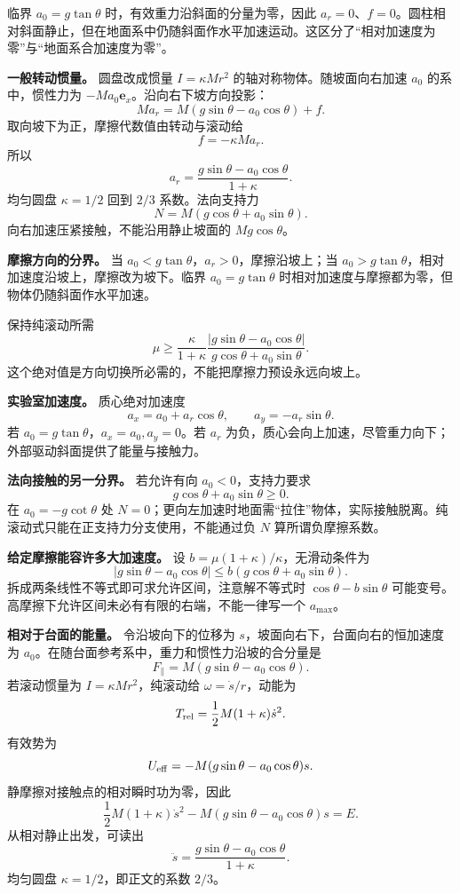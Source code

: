 \documentclass[12pt,a4paper,UTF8]{ctexart}
\begin{document}
临界 \(a_0=g\tan\theta\) 时，有效重力沿斜面的分量为零，因此
\(a_r=0\)、\(f=0\)。圆柱相对斜面静止，但在地面系中仍随斜面作水平加速运动。这区分了``相对加速度为零''与``地面系合加速度为零''。

\textbf{一般转动惯量。} 圆盘改成惯量 \(I=\kappa Mr^2\)
的轴对称物体。随坡面向右加速 \(a_0\) 的系中，惯性力为
\(-Ma_0\boldsymbol e_x\)。沿向右下坡方向投影： \[
Ma_r=M(g\sin\theta-a_0\cos\theta)+f.
\] 取向坡下为正，摩擦代数值由转动与滚动给 \[
f=-\kappa Ma_r.
\] 所以 \[
\boxed{a_r=\frac{g\sin\theta-a_0\cos\theta}{1+\kappa}}.
\] 均匀圆盘 \(\kappa=1/2\) 回到 \(2/3\) 系数。法向支持力 \[
N=M(g\cos\theta+a_0\sin\theta).
\] 向右加速压紧接触，不能沿用静止坡面的 \(Mg\cos\theta\)。

\textbf{摩擦方向的分界。} 当
\(a_0<g\tan\theta\)，\(a_r>0\)，摩擦沿坡上；当
\(a_0>g\tan\theta\)，相对加速度沿坡上，摩擦改为坡下。临界
\(a_0=g\tan\theta\) 时相对加速度与摩擦都为零，但物体仍随斜面作水平加速。

保持纯滚动所需 \[
\boxed{\mu\ge
\frac{\kappa}{1+\kappa}
\frac{|g\sin\theta-a_0\cos\theta|}
{g\cos\theta+a_0\sin\theta}}.
\] 这个绝对值是方向切换所必需的，不能把摩擦力预设永远向坡上。

\textbf{实验室加速度。} 质心绝对加速度 \[
a_x=a_0+a_r\cos\theta,\qquad
a_y=-a_r\sin\theta.
\] 若 \(a_0=g\tan\theta\)，\(a_x=a_0,a_y=0\)。若 \(a_r\)
为负，质心会向上加速，尽管重力向下；外部驱动斜面提供了能量与接触力。

\textbf{法向接触的另一分界。} 若允许有向 \(a_0<0\)，支持力要求 \[
g\cos\theta+a_0\sin\theta\ge0.
\] 在 \(a_0=-g\cot\theta\) 处
\(N=0\)；更向左加速时地面需``拉住''物体，实际接触脱离。纯滚动式只能在正支持力分支使用，不能通过负
\(N\) 算所谓负摩擦系数。

\textbf{给定摩擦能容许多大加速度。} 设
\(b=\mu(1+\kappa)/\kappa\)，无滑动条件为 \[
|g\sin\theta-a_0\cos\theta|
\le b(g\cos\theta+a_0\sin\theta).
\] 拆成两条线性不等式即可求允许区间，注意解不等式时
\(\cos\theta-b\sin\theta\)
可能变号。高摩擦下允许区间未必有有限的右端，不能一律写一个
\(a_{\max}\)。

\textbf{相对于台面的能量。} 令沿坡向下的位移为
\(s\)，坡面向右下，台面向右的恒加速度为
\(a_0\)。在随台面参考系中，重力和惯性力沿坡的合分量是 \[
F_\parallel=M(g\sin\theta-a_0\cos\theta).
\] 若滚动惯量为 \(I=\kappa Mr^2\)，纯滚动给 \(\omega=\dot s/r\)，动能为
\[
T_{\rm rel}=\frac12M(1+\kappa)\dot s^2.
\] 有效势为 \[
U_{\rm eff}=-M(g\sin\theta-a_0\cos\theta)s.
\] 静摩擦对接触点的相对瞬时功为零，因此 \[
\frac12M(1+\kappa)\dot s^2
-M(g\sin\theta-a_0\cos\theta)s=E.
\] 从相对静止出发，可读出 \[
\ddot s=\frac{g\sin\theta-a_0\cos\theta}{1+\kappa}.
\] 均匀圆盘 \(\kappa=1/2\)，即正文的系数 \(2/3\)。
\end{document}
